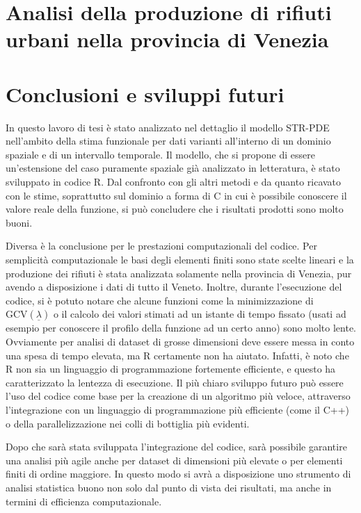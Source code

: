 \documentclass[a4paper,11pt,twoside,openright]{book}							%
\begin{document}
\chapter{Analisi della produzione di rifiuti urbani nella provincia di Venezia}
\label{cap:rifiuti}



\chapter{Conclusioni e sviluppi futuri}
\label{cap:conclusione}

In questo lavoro di tesi è stato analizzato nel dettaglio il modello STR-PDE nell'ambito della stima funzionale per dati varianti all'interno di un dominio spaziale e di un intervallo temporale. Il modello, che si propone di essere un'estensione del caso puramente spaziale già analizzato in letteratura, è stato sviluppato in codice R. Dal confronto con gli altri metodi e da quanto ricavato con le stime, soprattutto sul dominio a forma di C in cui è possibile conoscere il valore reale della funzione, si può concludere che i risultati prodotti sono molto buoni.

Diversa è la conclusione per le prestazioni computazionali del codice. Per semplicità computazionale le basi degli elementi finiti sono state scelte lineari e la produzione dei rifiuti è stata analizzata solamente nella provincia di Venezia, pur avendo a disposizione i dati di tutto il Veneto. Inoltre, durante l'esecuzione del codice, si è potuto notare che alcune funzioni come la minimizzazione di $\mathrm{GCV}(\underline \lambda)$ o il calcolo dei valori stimati ad un istante di tempo fissato (usati ad esempio per conoscere il profilo della funzione ad un certo anno) sono molto lente. Ovviamente per analisi di dataset di grosse dimensioni deve essere messa in conto una spesa di tempo elevata, ma R certamente non ha aiutato. Infatti, è noto che R non sia un linguaggio di programmazione fortemente efficiente, e questo ha caratterizzato la lentezza di esecuzione. Il più chiaro sviluppo futuro può essere l'uso del codice come base per la creazione di un algoritmo più veloce, attraverso l'integrazione con un linguaggio di programmazione più efficiente (come il C++) o della parallelizzazione nei colli di bottiglia più evidenti.

Dopo che sarà stata sviluppata l'integrazione del codice, sarà possibile garantire una analisi più agile anche per dataset di dimensioni più elevate o per elementi finiti di ordine maggiore. In questo modo si avrà a disposizione uno strumento di analisi statistica buono non solo dal punto di vista dei risultati, ma anche in termini di efficienza computazionale.
\end{document}
